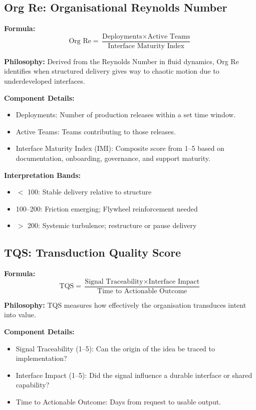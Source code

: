\documentclass[12pt]{article}
\begin{document}
\subsection{Org Re: Organisational Reynolds Number}

\textbf{Formula:}
\[
\text{Org Re} = \frac{\text{Deployments} \times \text{Active Teams}}{\text{Interface Maturity Index}}
\]

\textbf{Philosophy:} Derived from the Reynolds Number in fluid dynamics, Org Re identifies when structured delivery gives way to chaotic motion due to underdeveloped interfaces.

\textbf{Component Details:}
\begin{itemize}
    \item Deployments: Number of production releases within a set time window.
    \item Active Teams: Teams contributing to those releases.
    \item Interface Maturity Index (IMI): Composite score from 1–5 based on documentation, onboarding, governance, and support maturity.
\end{itemize}

\textbf{Interpretation Bands:}
\begin{itemize}
    \item $<$ 100: Stable delivery relative to structure
    \item 100--200: Friction emerging; Flywheel reinforcement needed
    \item $>$ 200: Systemic turbulence; restructure or pause delivery
\end{itemize}

\subsection{TQS: Transduction Quality Score}

\textbf{Formula:}
\[
\text{TQS} = \frac{\text{Signal Traceability} \times \text{Interface Impact}}{\text{Time to Actionable Outcome}}
\]

\textbf{Philosophy:} TQS measures how effectively the organisation transduces intent into value.

\textbf{Component Details:}
\begin{itemize}
    \item Signal Traceability (1–5): Can the origin of the idea be traced to implementation?
    \item Interface Impact (1–5): Did the signal influence a durable interface or shared capability?
    \item Time to Actionable Outcome: Days from request to usable output.
\end{itemize}
\end{document}
